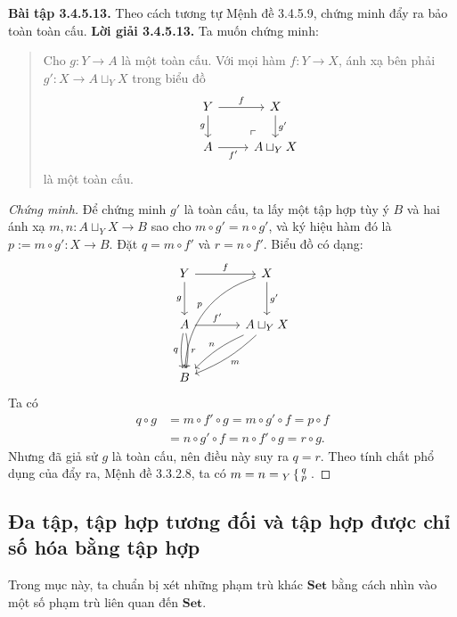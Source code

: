 \noindent\textbf{Bài tập 3.4.5.13.} Theo cách tương tự Mệnh đề 3.4.5.9, chứng minh đẩy ra bảo toàn toàn cấu.
\noindent\textbf{Lời giải 3.4.5.13.} Ta muốn chứng minh:
\begin{quote}Cho $g:Y\to A$ là một toàn cấu. Với mọi hàm $f:Y\to X$, ánh xạ bên phải $g':X\to A\sqcup_YX$ trong biểu đồ
\[\begin{tikzcd}Y\arrow[r,"f"]\arrow[d,"g"']&X\arrow[d,"g'"]\\A\arrow[r,"f'"']&A\sqcup_YX\arrow[ul,phantom,"\ulcorner",very near start]\end{tikzcd}\]
là một toàn cấu.\end{quote}
\begin{proof}[Chứng minh]
Để chứng minh $g'$ là toàn cấu, ta lấy một tập hợp tùy ý $B$ và hai ánh xạ $m,n:A\sqcup_YX\to B$ sao cho $m\circ g'=n\circ g'$, và ký hiệu hàm đó là $p:=m\circ g':X\to B$. Đặt $q=m\circ f'$ và $r=n\circ f'$. Biểu đồ có dạng:
\[\begin{tikzcd}[column sep=large,row sep=large]
Y\arrow[r,"f"]\arrow[d,"g"']&X\arrow[d,"g'"]\arrow[ddl,bend right=35,"p"']\\
A\arrow[r,"f'"]\arrow[d,bend right=10,"q"']\arrow[d,bend left=10,"r"]&A\sqcup_YX\arrow[dl,bend left=10,"m"]\arrow[dl,bend right=10,"n"']\\ B&
\end{tikzcd}\]
Ta có
\begin{align*}
q\circ g&=m\circ f'\circ g=m\circ g'\circ f=p\circ f\\
&=n\circ g'\circ f=n\circ f'\circ g=r\circ g.
\end{align*}
Nhưng đã giả sử $g$ là toàn cấu, nên điều này suy ra $q=r$. Theo tính chất phổ dụng của đẩy ra, Mệnh đề 3.3.2.8, ta có $m=n={}_Y\left\{\begin{smallmatrix}q\\p\end{smallmatrix}\right.$.
\end{proof}

\subsection{Đa tập, tập hợp tương đối và tập hợp được chỉ số hóa bằng tập hợp}
Trong mục này, ta chuẩn bị xét những phạm trù khác $\mathbf{Set}$ bằng cách nhìn vào một số phạm trù liên quan đến $\mathbf{Set}$.

